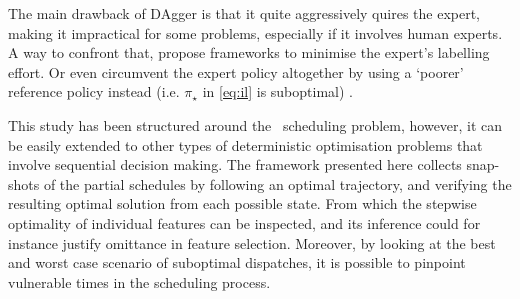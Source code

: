 \documentclass[twocolumn]{svjour3}
\begin{document}

The main drawback of DAgger is that it quite aggressively quires the expert, 
making it impractical for some problems, especially if it involves human 
experts. A way to confront that, \cite{Kim13,Judah12} propose frameworks to 
minimise the expert's labelling effort.
Or even circumvent the expert policy altogether by using a `poorer' reference 
policy instead (i.e. $\pi_\star$ in \cref{eq:il} is suboptimal) 
\cite{ChangKADL15}.

This study has been structured around the \jsp\ scheduling problem, however, 
it can be easily extended to other types of deterministic optimisation problems 
that involve sequential decision making. 
The framework presented here collects snap-shots of the partial schedules by 
following an optimal trajectory, and verifying the resulting optimal solution 
from each possible state. 
From which the stepwise optimality of individual features can be inspected, 
and its inference could for instance justify omittance in feature selection. 
Moreover, by looking at the best and worst case scenario of suboptimal 
dispatches, it is possible to pinpoint vulnerable times in the scheduling 
process. 

 
 
\end{document}
